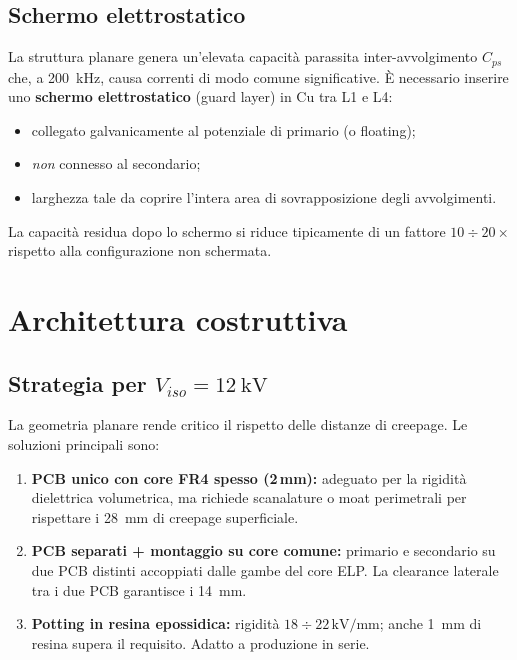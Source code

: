 \documentclass[a4paper,11pt]{article}
\begin{document}
\subsection{Schermo elettrostatico}

La struttura planare genera un'elevata capacità parassita inter-avvolgimento
$C_{ps}$ che, a \SI{200}{\kilo\hertz}, causa correnti di modo comune significative.
È necessario inserire uno \textbf{schermo elettrostatico} (guard layer) in Cu
tra L1 e L4:
\begin{itemize}
  \item collegato galvanicamente al potenziale di primario (o floating);
  \item \emph{non} connesso al secondario;
  \item larghezza tale da coprire l'intera area di sovrapposizione degli avvolgimenti.
\end{itemize}

La capacità residua dopo lo schermo si riduce tipicamente di un fattore
$10\div 20\times$ rispetto alla configurazione non schermata.

\section{Architettura costruttiva}

\subsection{Strategia per $V_{iso} = \SI{12}{\kilo\volt}$}

La geometria planare rende critico il rispetto delle distanze di creepage.
Le soluzioni principali sono:

\begin{enumerate}
  \item \textbf{PCB unico con core FR4 spesso (2\,mm):}
    adeguato per la rigidità dielettrica volumetrica, ma richiede
    scanalature o moat perimetrali per rispettare i \SI{28}{\milli\metre}
    di creepage superficiale.
  \item \textbf{PCB separati + montaggio su core comune:}
    primario e secondario su due PCB distinti accoppiati dalle gambe del
    core ELP. La clearance laterale tra i due PCB garantisce i \SI{14}{\milli\metre}.
  \item \textbf{Potting in resina epossidica:}
    rigidità $18\div 22\,\mathrm{kV/mm}$; anche \SI{1}{\milli\metre} di resina
    supera il requisito. Adatto a produzione in serie.
\end{enumerate}
\end{document}
